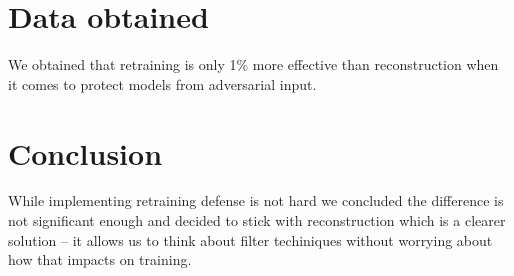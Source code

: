 \section{Data obtained}
We obtained that retraining is only 1\% more effective than reconstruction
when it comes to protect models from adversarial input.

\section{Conclusion}
While implementing retraining defense is not hard we concluded the
difference is not significant enough and decided to stick with
reconstruction which is a clearer solution -- it allows us to think about
filter techiniques without worrying about how that impacts on training.
